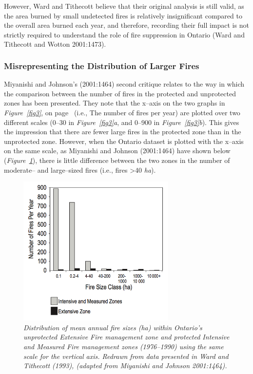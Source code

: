\begin{spacing}{1.5}
\noindent However, Ward and Tithecott believe that their original analysis is still valid, as the area burned by small undetected fires is relatively insignificant compared to the overall area burned each year, and therefore, recording their full impact is not strictly required to understand the role of fire suppression in Ontario (Ward and Tithecott and Wotton 2001:1473).

\subsubsection{Misrepresenting the Distribution of Larger Fires}

Miyanishi and Johnson's (2001:1464) second critique relates to the way in which the comparison between the number of fires in the protected and unprotected zones has been presented. They note that the x--axis on the two graphs in \emph{Figure~\ref{fig3}}, on page~\pageref{fig7} (i.e., The number of fires per year) are plotted over two different scales (0--30 in \emph{Figure~\ref{fig3}a}, and 0--900 in \emph{Figure~\ref{fig3}b}). This  gives the impression that there are fewer large fires in the protected zone than in the unprotected zone. However, when the Ontario dataset is plotted with the x--axis on the same scale, as Miyanishi and Johnson (2001:1464) have shown below (\emph{Figure~\ref{fig5}}), there is little difference between the two zones in the number of moderate-- and large--sized fires (i.e., fires >40 \emph{ha}). \\

\begin{figure}[h!]
  \centering
    \includegraphics[width=0.7\textwidth]{media/fig5}
      \caption[Distribution of mean annual fire sizes, using same vertical axis]{\emph{Distribution of mean annual fire sizes (\emph{ha}) within Ontario's unprotected Extensive Fire management zone and protected Intensive and Measured Fire management zones (1976--1990) using the same scale for the vertical axis. Redrawn from data presented in Ward and Tithecott (1993), (adapted from Miyanishi and Johnson 2001:1464).}}
        \label{fig5}
\end{figure}


\end{spacing}
